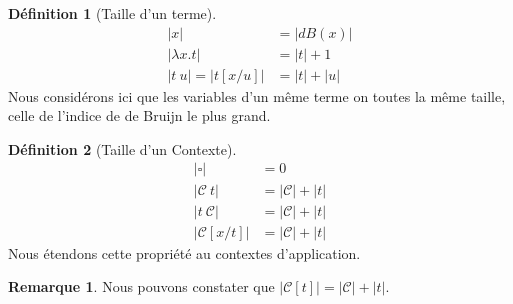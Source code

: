 \documentclass[11pt,a4paper]{article}
\theoremstyle{definition}
\newtheorem{definition}{Définition}[section]
\newtheorem*{remark}{Remarque}
\newcommand{\mtc}{\mathcal{C}}
\begin{document}
\begin{definition}[Taille d'un terme]
  \begin{align*}
    |x| &= |dB(x)|\\
    |\lambda x.t| &= |t| + 1\\
    |t~u| = |t[x/u]| &= |t| + |u|
  \end{align*}
  Nous considérons ici que les variables d'un même terme on toutes la même taille, celle de l'indice de de Bruijn le plus grand.
\end{definition}

\begin{definition}[Taille d'un Contexte]
  \begin{align*}
    |\square| &= 0\\
    |\mtc~t| &= |\mtc|+|t|\\
    |t~\mtc| &= |\mtc|+|t|\\
    |\mtc[x/t]| &= |\mtc| +|t|
  \end{align*}
  Nous étendons cette propriété au contextes d'application.
\end{definition}

\begin{remark}
  Nous pouvons constater que $|\mtc[t]| = |\mtc|+|t|$.
\end{remark}
\end{document}

